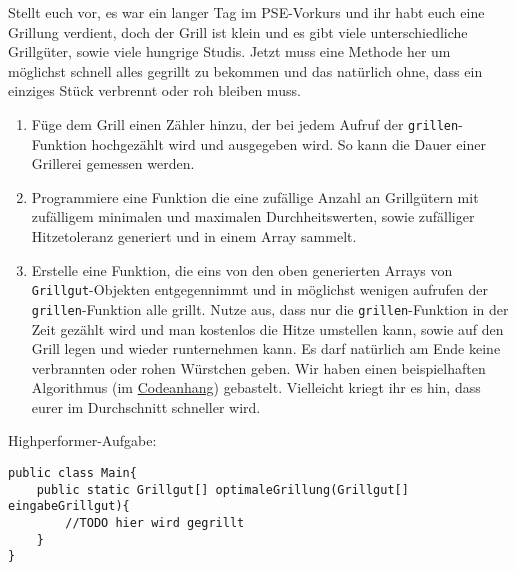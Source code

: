 \documentclass{../../sheet}
\begin{document}
\newpage
{}
Stellt euch vor, es war ein langer Tag im PSE-Vorkurs und ihr habt euch eine Grillung verdient, doch der Grill ist klein und es gibt viele unterschiedliche Grillgüter, sowie viele hungrige Studis. Jetzt muss eine Methode her um möglichst schnell alles gegrillt zu bekommen und das natürlich ohne, dass ein einziges Stück verbrennt oder roh bleiben muss.
\begin{enumerate}
    \item Füge dem Grill einen Zähler hinzu, der bei jedem Aufruf der \texttt{grillen}-Funktion hochgezählt wird und ausgegeben wird. So kann die Dauer einer Grillerei gemessen werden.
    \item Programmiere eine Funktion die eine zufällige Anzahl an Grillgütern mit zufälligem minimalen und maximalen Durchheitswerten, sowie zufälliger Hitzetoleranz generiert und in einem Array sammelt.
    \item Erstelle eine Funktion, die eins von den oben generierten Arrays von \texttt{Grillgut}-Objekten entgegennimmt und in möglichst wenigen aufrufen der \texttt{grillen}-Funktion alle grillt. Nutze aus, dass nur die \texttt{grillen}-Funktion in der Zeit gezählt wird und man kostenlos die Hitze umstellen kann, sowie auf den Grill legen und wieder runternehmen kann. Es darf natürlich am Ende keine verbrannten oder rohen Würstchen geben. Wir haben einen beispielhaften Algorithmus (im \hyperlink{Highperformer}{Codeanhang}) gebastelt. Vielleicht kriegt ihr es hin, dass eurer im Durchschnitt schneller wird.
\end{enumerate}

\newpage
{}
Highperformer-Aufgabe:
\hypertarget{Highperformer}{}
\begin{verbatim}
public class Main{
    public static Grillgut[] optimaleGrillung(Grillgut[] eingabeGrillgut){
        //TODO hier wird gegrillt
    }
}
\end{verbatim}
\end{document}
